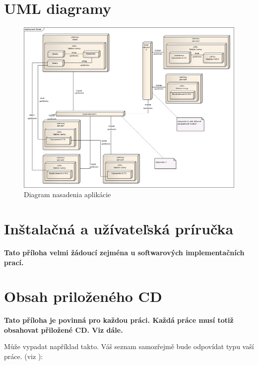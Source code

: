 \documentclass[11pt,twoside,a4paper]{book}
\begin{document}
\chapter{UML diagramy}


\begin{figure}[h]
 \centering
 \includegraphics[width=16cm]{./figures/deploy.png}
 \caption{Diagram nasadenia aplikácie}
 \label{fig:Deployment}
\end{figure}


\chapter{Inštalačná a užívateľská príručka}
\textbf{\large Tato příloha velmi žádoucí zejména u softwarových implementačních prací.}


\chapter{Obsah priloženého CD}
\textbf{\large Tato příloha je povinná pro každou práci. Každá práce musí totiž obsahovat přiložené CD. Viz dále.}

Může vypadat například takto. Váš seznam samozřejmě bude odpovídat typu vaší práce. (viz \cite{infodp}):
\end{document}
